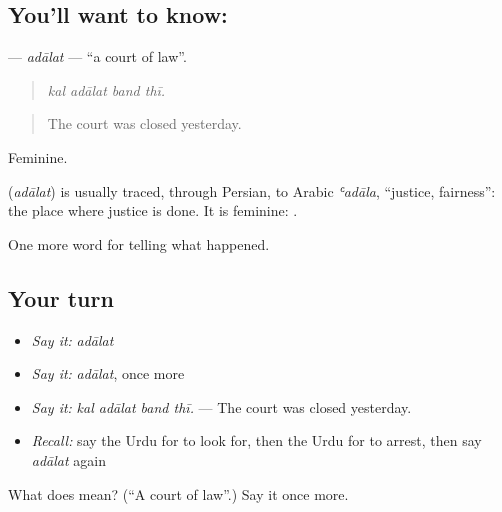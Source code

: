 \subsection*{You'll want to know: }
\textbf{} — \emph{adālat} — \textquotedblleft{}a court of law\textquotedblright{}.

\begin{quote}
   
\end{quote}

\begin{quote}
\emph{kal adālat band thī.}
\end{quote}

\begin{quote}
The court was closed yesterday.
\end{quote}

Feminine.

\begin{cousinweb}
\textbf{} (\emph{adālat}) is usually traced, through Persian, to Arabic \emph{ʿadāla}, \textquotedblleft{}justice, fairness\textquotedblright{}: the place where justice is done. It is feminine: \textbf{  }.
\end{cousinweb}

\begin{grammarlens}[title={What you've built}]
One more word for telling what happened.
\end{grammarlens}

\subsection*{Your turn}
\begin{itemize}
\raggedright
  \item \emph{Say it:} \emph{adālat}
  \item \emph{Say it:} \emph{adālat}, once more
  \item \emph{Say it:} \emph{kal adālat band thī.} — The court was closed yesterday.
  \item \emph{Recall:} say the Urdu for to look for, then the Urdu for to arrest, then say \emph{adālat} again
\end{itemize}

\begin{tcolorbox}[breakable,colback=teal!4,colframe=teal!35!black,title={Before you move on}]
What does  mean? (\textquotedblleft{}A court of law\textquotedblright{}.) Say it once more.
\end{tcolorbox}
